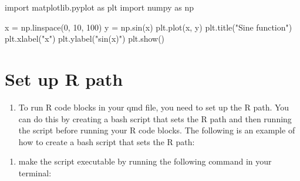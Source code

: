 \documentclass[
  letterpaper,
  DIV=11,
  numbers=noendperiod]{scrartcl}
\newenvironment{Shaded}{\begin{snugshade}}{\end{snugshade}}
\newcommand{\DecValTok}[1]{\textcolor[rgb]{0.68,0.00,0.00}{#1}}
\newcommand{\FunctionTok}[1]{\textcolor[rgb]{0.28,0.35,0.67}{#1}}
\newcommand{\ImportTok}[1]{\textcolor[rgb]{0.00,0.46,0.62}{#1}}
\newcommand{\NormalTok}[1]{\textcolor[rgb]{0.00,0.23,0.31}{#1}}
\newcommand{\OperatorTok}[1]{\textcolor[rgb]{0.37,0.37,0.37}{#1}}
\newcommand{\StringTok}[1]{\textcolor[rgb]{0.13,0.47,0.30}{#1}}
\providecommand{\tightlist}{%
  \setlength{\itemsep}{0pt}\setlength{\parskip}{0pt}}
\begin{document}
\begin{Shaded}
\begin{Highlighting}[]
\ImportTok{import}\NormalTok{ matplotlib.pyplot }\ImportTok{as}\NormalTok{ plt}
\ImportTok{import}\NormalTok{ numpy }\ImportTok{as}\NormalTok{ np}

\NormalTok{x }\OperatorTok{=}\NormalTok{ np.linspace(}\DecValTok{0}\NormalTok{, }\DecValTok{10}\NormalTok{, }\DecValTok{100}\NormalTok{)}
\NormalTok{y }\OperatorTok{=}\NormalTok{ np.sin(x)}
\NormalTok{plt.plot(x, y)}
\NormalTok{plt.title(}\StringTok{"Sine function"}\NormalTok{)}
\NormalTok{plt.xlabel(}\StringTok{"x"}\NormalTok{)}
\NormalTok{plt.ylabel(}\StringTok{"sin(x)"}\NormalTok{)}
\NormalTok{plt.show()}
\end{Highlighting}
\end{Shaded}

\section{Set up R path}\label{set-up-r-path}

\begin{enumerate}
\def\labelenumi{\arabic{enumi}.}
\tightlist
\item
  To run R code blocks in your qmd file, you need to set up the R path.
  You can do this by creating a bash script that sets the R path and
  then running the script before running your R code blocks. The
  following is an example of how to create a bash script that sets the R
  path:
\end{enumerate}

\begin{Shaded}
\end{Shaded}

\begin{enumerate}
\def\labelenumi{\arabic{enumi}.}
\setcounter{enumi}{1}
\tightlist
\item
  make the script executable by running the following command in your
  terminal:
\end{enumerate}
\end{document}
